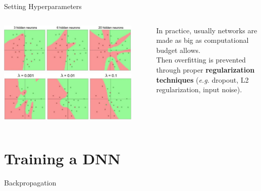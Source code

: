\documentclass[aspectratio=169]{beamer}
\begin{document}

\begin{frame}{Setting Hyperparameters}
\begin{columns}
\begin{column}{0.6\textwidth}
\includegraphics[width=0.9\textwidth]{img/dnn/dnn_overfit.jpg}\\
\includegraphics[width=0.9\textwidth]{img/dnn/dnn_overfit_reg.jpg}
\end{column}
\begin{column}{0.4\textwidth}
In practice, usually networks are made as big as computational budget allows.\\
\vspace{0.5cm}
Then overfitting is prevented through proper \textbf{regularization techniques} (\emph{e.g.} dropout, L2 regularization, input noise).
\end{column}
\end{columns}
\end{frame}


\section{Training a DNN}

\begin{frame}{Backpropagation}

\end{frame}
\end{document}

